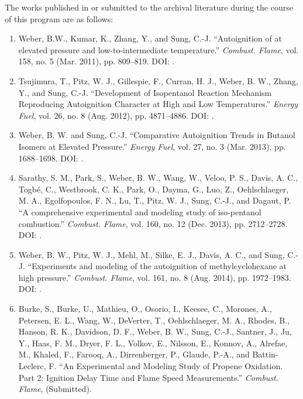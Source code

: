 \documentclass[../main.tex]{subfiles}
\begin{document}
The works published in or submitted to the archival literature during the
course of this program are as follows:
\begin{enumerate}
\item[] Weber, B.W., Kumar, K., Zhang, Y., and Sung, C.-J.
        ``Autoignition of \nBuOH{} at elevated pressure and
        low-to-intermediate temperature.'' \textit{Combust. Flame},
        vol. 158, no. 5 (Mar. 2011), pp. 809--819.
        DOI: .
\item[] Tsujimura, T., Pitz, W. J., Gillespie, F., Curran, H. J., Weber,
        B. W., Zhang, Y., and Sung, C.-J. ``Development of Isopentanol
        Reaction Mechanism Reproducing Autoignition Character at High
        and Low Temperatures.'' \textit{Energy Fuel}, vol. 26, no. 8
        (Aug. 2012), pp. 4871--4886. DOI: .
\item[] Weber, B. W. and Sung, C.-J. ``Comparative Autoignition Trends
        in Butanol Isomers at Elevated Pressure.'' \textit{Energy Fuel},
        vol. 27, no. 3 (Mar. 2013), pp. 1688--1698.
        DOI: .
\item[] Sarathy, S. M., Park, S., Weber, B. W., Wang, W., Veloo, P. S.,
        Davis, A. C., Togbé, C., Westbrook, C. K., Park, O., Dayma, G.,
        Luo, Z., Oehlschlaeger, M. A., Egolfopoulos, F. N., Lu, T.,
        Pitz, W. J., Sung, C.-J., and Dagaut, P. ``A comprehensive
        experimental and modeling study of iso-pentanol combustion.''
        \textit{Combust. Flame}, vol. 160, no. 12 (Dec. 2013),
        pp. 2712--2728. DOI: .
\item[] Weber, B. W., Pitz, W. J., Mehl, M., Silke, E. J., Davis, A. C.,
        and Sung, C.-J. ``Experiments and modeling of the autoignition
        of methylcyclohexane at high pressure.'' \textit{Combust. Flame},
        vol. 161, no. 8 (Aug. 2014), pp. 1972--1983.
        DOI: .
\item[] Burke, S., Burke, U., Mathieu, O., Osorio, I., Keesee, C.,
        Morones, A., Petersen, E. L., Wang, W., DeVerter, T.,
        Oehlschlaeger, M. A., Rhodes, B., Hanson, R. K., Davidson, D. F.,
        Weber, B. W., Sung, C.-J., Santner, J., Ju, Y., Haas, F. M.,
        Dryer, F. L., Volkov, E., Nilsson, E., Konnov, A., Alrefae, M.,
        Khaled, F., Farooq, A., Dirrenberger, P., Glaude, P.-A., and
        Battin-Leclerc, F. ``An Experimental and Modeling Study of
        Propene Oxidation. Part 2: Ignition Delay Time and Flame Speed
        Measurements.'' \textit{Combust. Flame}, (Submitted).
\end{enumerate}
\end{document}
